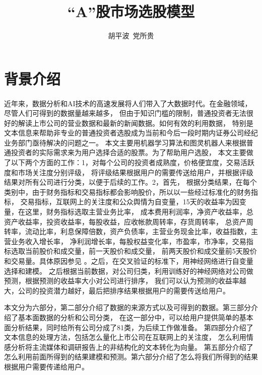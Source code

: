 \documentclass[UTF8]{ctexart}
\begin{document}
\author{胡平波\ 党所贵}
\title{“A”股市场选股模型}

\maketitle
\tableofcontents
\newpage

\section{背景介绍}
\paragraph*{}
近年来，数据分析和AI技术的高速发展将人们带入了大数据时代。在金融领域，尽管人们可得到的数据量越来越多，
但由于知识门槛的限制，普通投资者无法很好的解读上市公司的营业数据和最新的新闻数据。如何有效的利用数据，
特别是文本信息来帮助非专业的普通投资者选股成为当前和今后一段时期内证券公司经纪业务部门亟待解决的问题之一。
本文主要用机器学习算法和图灵机器人来根据普通投资者的实际需求来为用户选择合适的股票。为了帮助用户选股，
本文主要做了以下两个方面的工作：1，对每个公司的投资者成熟度，价格便宜度，交易活跃度和市场关注度分别评级，
将评级结果根据用户的需要传送给用户，并根据评级结果对所有公司进行分类，以便于后续的工作。2，首先，
根据分类结果，在每个类别中，由于财务指标和交易指标都会影响股价，所以以一些经过标准化的财务指标，
交易指标，互联网上的关注度和公众舆情为自变量，15天的收益率为因变量，在这里，财务指标选取主营业务比率，
成本费用利润率，净资产收益率，总资产收益率，投资收益率，每股收益，应收帐款周转率，存货周转率，
总资产周转率，流动比率，利息保障倍数，资产负债率，主营业务现金比率，收益指数，主营业务收入增长率，
净利润增长率，每股权益变化率，市盈率，市净率，交易指标选取当前股价和成交量，前一天股价和成交量，
前两天股价和成交量前5天股价和交易量。具体原因参见 \cite{ph1}。之后，在交叉验证的标准下，用神经网络进行自变量选择和建模。
之后根据当前数据，对公司归类，利用训练好的神经网络对公司做预测，根据预测的收益率大小对公司进行排序，
我们可以认为预测的收益率越大，公司的投资潜力越好，最后把排序结果根据用户的需要传送给用户。

本文分为六部分，第二部分介绍了数据的来源方式以及可得到的数据。第三部分介绍了基本面数据的分析和公司分类，
在这一部分中，可以给用户提供简单的基本面分析结果，同时给所有公司分成了81类，为后续工作做准备。
第四部分介绍了文本信息的处理方法，包括怎么量化上市公司在互联网上的关注度，
怎么利用情感分析将主流媒体和调研报告上的非结构化的文本转化为向量。
第五部分介绍了怎么利用前面所得到的结果建模和预测。第六部分介绍了怎么将我们所得到的结果根据用户需要传递给用户。
\end{document}
